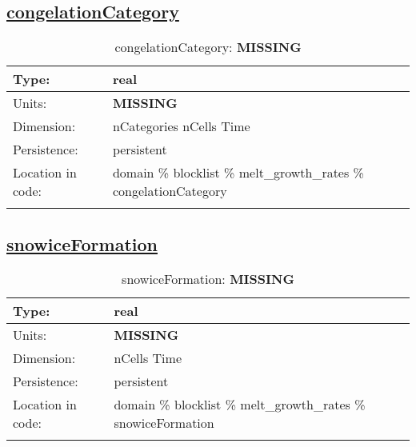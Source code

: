 \subsection[congelationCategory]{\hyperref[sec:var_tab_melt_growth_rates]{congelationCategory}}
\label{subsec:var_sec_melt_growth_rates_congelationCategory}
\begin{center}
\begin{longtable}{| p{2.0in} | p{4.0in} |}
        \hline 
        Type: & real \\
        \hline 
        Units: & {\bf \color{red} MISSING} \\
        \hline 
        Dimension: & nCategories nCells Time \\
        \hline 
        Persistence: & persistent \\
        \hline 
         Location in code: & domain \% blocklist \% melt\_growth\_rates \% congelationCategory \\
         \hline 
    \caption{congelationCategory: {\bf \color{red} MISSING}}
\end{longtable}
\end{center}
\subsection[snowiceFormation]{\hyperref[sec:var_tab_melt_growth_rates]{snowiceFormation}}
\label{subsec:var_sec_melt_growth_rates_snowiceFormation}
\begin{center}
\begin{longtable}{| p{2.0in} | p{4.0in} |}
        \hline 
        Type: & real \\
        \hline 
        Units: & {\bf \color{red} MISSING} \\
        \hline 
        Dimension: & nCells Time \\
        \hline 
        Persistence: & persistent \\
        \hline 
         Location in code: & domain \% blocklist \% melt\_growth\_rates \% snowiceFormation \\
         \hline 
    \caption{snowiceFormation: {\bf \color{red} MISSING}}
\end{longtable}
\end{center}
